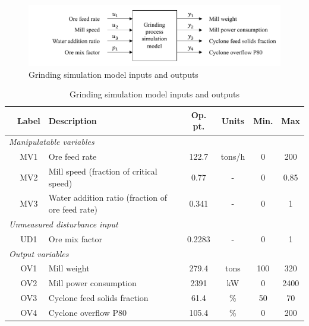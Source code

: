 \begin{figure}[htp]
	\centering
	\includegraphics[width=15cm]{images/grind_sim_io_diag.pdf}
	\caption{Grinding simulation model inputs and outputs}
	\label{fig:grind_sim_io_diag}
\end{figure}

\begin{table}[h!]
	\centering
	\caption{Grinding simulation model inputs and outputs} \label{tb:grind-vars}
	\begin{tabular}{c c >{\raggedright}p{5.5cm} c c c c}
		& Label & Description & Op. pt. & Units & Min. & Max \\
		\midrule
		\multicolumn{7}{l}{\textit{Manipulatable variables}} \\
		  & MV1       & Ore feed rate & 122.7 & tons/h & 0 & 200 \\   
		  & MV2       & Mill speed (fraction of critical speed) & 0.77 & - & 0 & 0.85 \\ 
		  & MV3       & Water addition ratio (fraction of ore feed rate) & 0.341 & - & 0 & 1 \\ 
		\multicolumn{7}{l}{\textit{Unmeasured disturbance input}} \\
		  & UD1        & Ore mix factor & 0.2283 & - & 0 & 1  \\ 
		\multicolumn{7}{l}{\textit{Output variables}} \\
		  & OV1        & Mill weight & 279.4 & tons & 100 & 320  \\ 
		  & OV2       & Mill power consumption & 2391 & kW & 0 & 2400  \\ 
		  & OV3       & Cyclone feed solids fraction & 61.4 & \% & 50 & 70  \\ 
		  & OV4       & Cyclone overflow P80 & 105.4 & \% & 0 & 200  \\ 
		\bottomrule
	\end{tabular}
\end{table}

